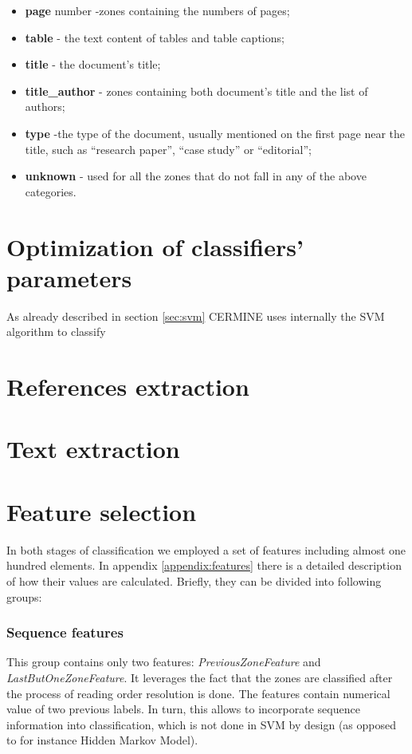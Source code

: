 \begin{itemize}
    \item \textbf{page} number -zones containing the numbers of pages;
    \item \textbf{table} - the text content of tables and table captions;
    \item \textbf{title} - the document's title;
    \item \textbf{title\_author} - zones containing both document's title and the list of authors;
    \item \textbf{type} -the type of the document, usually mentioned on the first page near the title, such as ``research paper'', ``case study'' or ``editorial'';
    \item \textbf{unknown} - used for all the zones that do not fall in any of the above categories.
\end{itemize}
\section{Optimization of classifiers' parameters} 
As already described in section \ref{sec:svm} CERMINE uses internally the SVM algorithm to classify  
\section{References extraction}
\section{Text extraction}
\section{Feature selection}
In both stages of classification we employed a set of features including almost one hundred elements. In appendix \ref{appendix:features} there is a detailed description of how their values are calculated. Briefly, they can be divided into following groups:
\subsubsection{Sequence features}
This group contains only two features: \textit{PreviousZoneFeature} and \textit{LastButOneZoneFeature}. It leverages the fact that the zones are classified after the process of reading order resolution is done. The features contain numerical value of two previous labels. In turn, this allows to incorporate sequence information into classification, which is not done in SVM by design (as opposed to for instance Hidden Markov Model).
